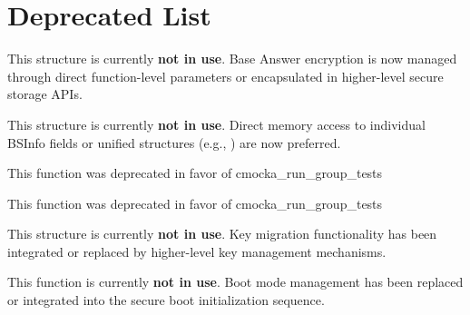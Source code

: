 \chapter{Deprecated List}
\hypertarget{deprecated}{}\label{deprecated}

\begin{DoxyRefList}
\item[Struct \doxylink{structbaseansr__t}{baseansr\+\_\+t} ]\label{deprecated__deprecated000009}%
%
 This structure is currently {\bfseries{not in use}}. Base Answer encryption is now managed through direct function-\/level parameters or encapsulated in higher-\/level secure storage APIs. 
\item[Struct \doxylink{structfsbl__bsinfo__ptr__t}{fsbl\+\_\+bsinfo\+\_\+ptr\+\_\+t} ]\label{deprecated__deprecated000007}%
%
 This structure is currently {\bfseries{not in use}}. Direct memory access to individual BSInfo fields or unified structures (e.\+g., ) are now preferred. 
\item[Global \doxylink{group__cmocka__exec_ga246dbcbb338e4becbfef009b2bb14b78}{group\+\_\+test\+\_\+setup} (setup)]\label{deprecated__deprecated000004}%
%
This function was deprecated in favor of cmocka\+\_\+run\+\_\+group\+\_\+tests  
\item[Global \doxylink{group__cmocka__exec_ga03159d4169e85cb92bb0eba97cfcf18d}{group\+\_\+test\+\_\+teardown} (teardown)]\label{deprecated__deprecated000005}%
%
This function was deprecated in favor of cmocka\+\_\+run\+\_\+group\+\_\+tests  
\item[Struct \doxylink{structmig__key__t}{mig\+\_\+key\+\_\+t} ]\label{deprecated__deprecated000008}%
%
 This structure is currently {\bfseries{not in use}}. Key migration functionality has been integrated or replaced by higher-\/level key management mechanisms. 
\item[Global \doxylink{SBC__FileCtrl_8c_a628ab578804897888390b1e69b1f34ba}{SBC\+\_\+\+Read\+Boot\+Mode} (VOID)]\label{deprecated__deprecated000010}%
%
 This function is currently {\bfseries{not in use}}. Boot mode management has been replaced or integrated into the secure boot initialization sequence. 
\item[Global \doxylink{group__cmocka__exec_gaf79fe61343efe7cdeb5bbb12a5577cb3}{unit\+\_\+test} (f)]\label{deprecated__deprecated000001}%

\end{DoxyRefList}
